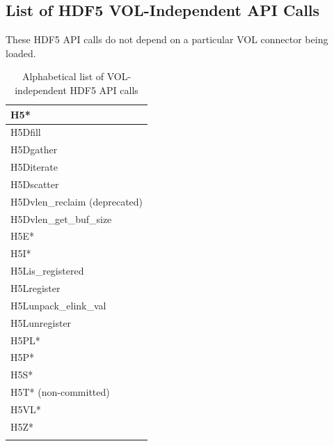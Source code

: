 \subsection{List of HDF5 VOL-Independent API Calls}

These HDF5 API calls do not depend on a particular VOL connector being loaded.

\begin{longtable}{ |>{\raggedright\arraybackslash}p{\linewidth}| }
    \hline
    H5* \\
    \hline
    H5Dfill \\
    H5Dgather \\
    H5Diterate \\
    H5Dscatter \\
    H5Dvlen\_reclaim (deprecated) \\
    H5Dvlen\_get\_buf\_size \\
    \hline
    H5E* \\
    H5I* \\
    \hline
    H5Lis\_registered \\
    H5Lregister \\
    H5Lunpack\_elink\_val \\
    H5Lunregister \\
    \hline
    H5PL* \\
    H5P* \\
    H5S* \\
    H5T* (non-committed) \\
    H5VL* \\
    H5Z* \\
    \hline
\caption{Alphabetical list of VOL-independent HDF5 API calls}
\end{longtable}

